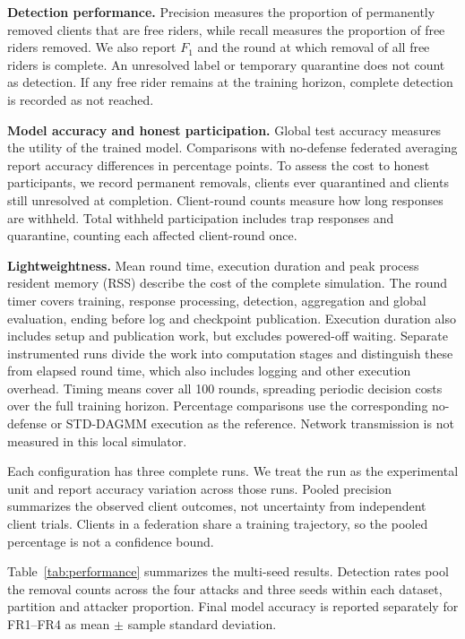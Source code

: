 \documentclass[journal]{IEEEtran}
\makeatletter
\renewcommand{\subsection}{\@startsection{subsection}{2}{\z@}{1.5ex}{0.7ex}{\normalfont\normalsize\itshape}}
\makeatother
\begin{document}
\textbf{Detection performance.} Precision measures the proportion of
permanently removed clients that are free riders, while recall measures
the proportion of free riders removed. We also report $F_1$ and the round at which removal
of all free riders is complete. An unresolved label or temporary quarantine
does not count as detection. If any free rider remains at the training
horizon, complete detection is recorded as not reached.

\textbf{Model accuracy and honest participation.} Global test accuracy
measures the utility of the trained model. Comparisons with no-defense
federated averaging report accuracy differences in percentage points.
To assess the cost to honest participants, we record permanent removals,
clients ever quarantined and clients still unresolved at completion.
Client-round counts measure how long responses are withheld. Total
withheld participation includes trap responses and quarantine, counting
each affected client-round once.

\textbf{Lightweightness.} Mean round time, execution duration and peak
process resident memory (RSS) describe the cost of the complete simulation.
The round timer covers training, response processing, detection,
aggregation and global evaluation, ending before log and checkpoint
publication. Execution duration also includes setup and publication work,
but excludes powered-off waiting. Separate instrumented runs divide the
work into computation stages and distinguish these from elapsed round
time, which also includes logging and other execution overhead. Timing means
cover all 100 rounds, spreading periodic decision costs over the full
training horizon. Percentage comparisons use the corresponding
no-defense or STD-DAGMM execution as the reference. Network transmission
is not measured in this local simulator.

Each configuration has three complete runs. We treat the run as the
experimental unit and report accuracy variation across those runs.
Pooled precision summarizes the observed client outcomes, not uncertainty
from independent client trials. Clients in a federation share a training
trajectory, so the pooled percentage is not a confidence bound.


\subsection{Permanent Detection and Model Utility}
Table~\ref{tab:performance} summarizes the multi-seed results. Detection
rates pool the removal counts across the four attacks and three seeds
within each dataset, partition and attacker proportion. Final model accuracy is reported
separately for FR1--FR4 as mean $\pm$ sample standard deviation.
\end{document}
